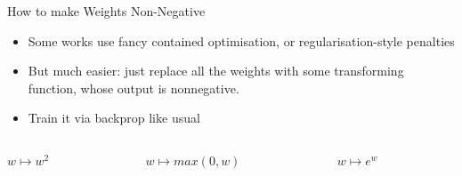 \documentclass[dvipsnames,handout]{beamer}
\begin{document}
\begin{frame}{How to make Weights Non-Negative}
	\begin{itemize}
		\item Some works use fancy contained optimisation, or regularisation-style penalties
		\item But much easier: just replace all the weights with some transforming function, whose output is nonnegative.
		\item Train it via backprop like usual
	\end{itemize}
	
	\begin{columns}[onlytextwidth]
		\begin{column}{0.33\textwidth}
			\centering
			 $w \mapsto w^2$
		\end{column}
		
		
		\begin{column}{0.33\textwidth}
			\centering
			 $w \mapsto max(0,w)$
		\end{column}
		
		
		\begin{column}{0.33\textwidth}
			\centering
			 $w\mapsto e^w$
		\end{column}	
	\end{columns}	
\end{frame}
\end{document}
